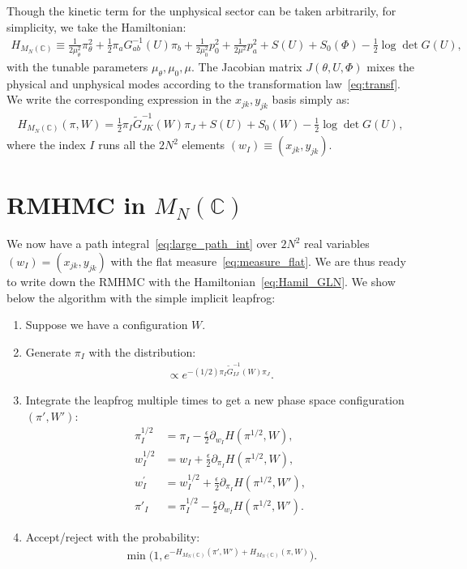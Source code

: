 \documentclass[12pt]{article}
\begin{document}
Though the kinetic term for the unphysical sector
can be taken arbitrarily,
for simplicity, we take the Hamiltonian:
\begin{align}
  H_{M_N(\mathbb{C})}
  \equiv
  \frac{1}{2 \mu_\theta^2}
  \pi_\theta^2
  +
  \frac{1}{2}
  \pi_a G^{-1}_{ab} (U) \pi_b
  +
  \frac{1}{2 \mu_0^2}
  p_0^2
  +
  \frac{1}{2 \mu^2}
  p_a^2
  +
  S(U)
  +
  S_0(\Phi)
  - \frac{1}{2} \log \det G(U),
\end{align}
with the tunable parameters $\mu_\theta, \mu_0, \mu$.
The Jacobian matrix $J(\theta, U, \Phi)$ mixes the
physical and unphysical modes according to
the transformation law~\eqref{eq:transf}.
We write the corresponding expression in the $x_{jk}, y_{jk}$
basis simply as:
\begin{align}
  H_{M_N(\mathbb{C})}
  (\pi, W)
  =
  \frac{1}{2} \pi_I \tilde{G}_{JK}^{-1}(W) \pi_J + S(U) + S_0(W)
  - \frac{1}{2} \log \det G(U),
  \label{eq:Hamil_GLN}
\end{align}
where the index $I$ runs all the $2N^2$ elements
$(w_I) \equiv ( x_{jk}, y_{jk} )$.


\section{RMHMC in $M_N(\mathbb{C})$}
\label{sec:rmhmc_gln}

We now have
a path integral~\eqref{eq:large_path_int}
over $2N^2$ real variables
$(w_I) = (x_{jk}, y_{jk})$
with the flat measure~\eqref{eq:measure_flat}.
We are thus ready to write down the
RMHMC with the Hamiltonian~\eqref{eq:Hamil_GLN}.
We show below the algorithm with the simple implicit leapfrog:
\begin{enumerate}
\item Suppose we have a configuration $W$.
\item Generate $\pi_I$
  with the distribution:
  \begin{align}
    \propto e^{-(1/2) \pi_I \tilde G_{IJ}^{-1}(W) \pi_J}.
  \end{align}
\item
  Integrate the leapfrog
  multiple times to get a new phase space configuration $(\pi',W')$:
  \begin{align}
    \pi_I^{1/2}
    &=
      \pi_I
      -
      \frac{\epsilon}{2}
      \partial_{w_I} H(\pi^{1/2}, W)
      ,
      \label{eq:p_half}
    \\
    w_I^{1/2}
    &=
      w_I
      +
      \frac{\epsilon}{2}
      \partial_{\pi_I} H(\pi^{1/2}, W)
      ,
      \label{eq:q_half}
    \\
    w_I^{\prime}
    &=
      w_I^{1/2}
      +
      \frac{\epsilon}{2}
      \partial_{\pi_I} H(\pi^{1/2}, W')
      ,
      \label{eq:q_prime}
    \\
    \pi'_I
    &= \pi_I^{1/2}
      -
      \frac{\epsilon}{2}
      \partial_{w_I} H(\pi^{1/2}, W').
      \label{eq:p_prime}
  \end{align}
\item Accept/reject with the probability:
  \begin{align}
    \min \Big(
    1, e^{-H_{M_N(\mathbb{C})}(\pi',W') + H_{M_N(\mathbb{C})}(\pi, W)}
    \Big).
  \end{align}
\end{enumerate}
\end{document}
